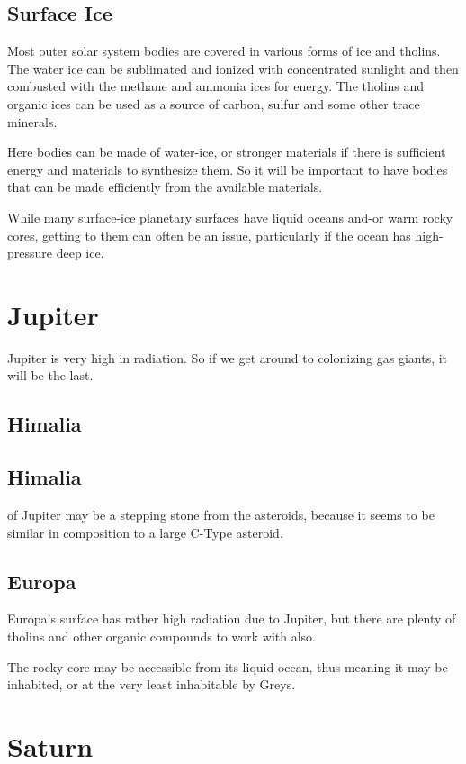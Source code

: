 \subsection{Surface Ice}
Most outer solar system bodies are covered in various forms of ice and tholins.
The water ice can be sublimated and ionized with concentrated sunlight and then
combusted with the methane and ammonia ices for energy. The tholins and organic
ices can be used as a source of carbon, sulfur and some other trace minerals. 

Here bodies can be made of water-ice, or stronger materials if there is
sufficient energy and materials to synthesize them. So it will be important to 
have bodies that can be made efficiently from the available materials.  

While many surface-ice planetary surfaces have 
liquid oceans and-or warm rocky cores, getting to them can often be an issue,
particularly if the ocean has high-pressure deep ice. 


\section{Jupiter}
Jupiter is very high in radiation.  So if we get around to colonizing gas
giants, it will be the last. 

\subsection{Himalia}

\subsection{Himalia} of Jupiter may be a stepping stone from the asteroids,
because it seems to be similar in composition to a large C-Type asteroid. 

\subsection{Europa}
Europa's surface has rather high radiation due to Jupiter, but there are plenty
of tholins and other organic compounds to work with also. 

The rocky core may be accessible from its liquid ocean, thus meaning it may be
inhabited, or at the very least inhabitable by Greys. 

\section{Saturn}

